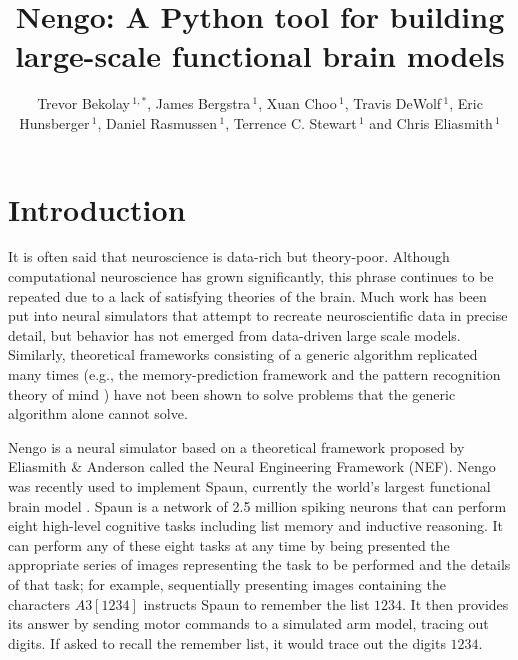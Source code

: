 \documentclass{frontiersSCNS}
\def\keyFont{\fontsize{8}{11}\helveticabold }
\def\firstAuthorLast{Bekolay {et~al.}}
\def\Authors{Trevor Bekolay\,$^{1,*}$, James Bergstra\,$^{1}$,
  Xuan Choo\,$^{1}$, Travis DeWolf\,$^{1}$, Eric Hunsberger\,$^{1}$,
  Daniel Rasmussen\,$^{1}$, Terrence C. Stewart\,$^{1}$
  and Chris Eliasmith\,$^{1}$}
\begin{document}
\onecolumn
{}

\title[Nengo in Python]{Nengo: A Python tool for
  building large-scale functional brain models}
\author[\firstAuthorLast ]{\Authors}
\address{}
\correspondance{}
\extraAuth{}

\maketitle

\begin{abstract}

  \tiny \keyFont{\section{Keywords:} 1 2 3 4 5 (6 7 8)}
\end{abstract}


\section{Introduction}

It is often said that neuroscience
is data-rich but theory-poor.
Although computational neuroscience
has grown significantly,
this phrase continues to be repeated
due to a lack of satisfying
theories of the brain.
Much work has been put into neural simulators
that attempt to recreate neuroscientific
data in precise detail,
but behavior has not emerged
from data-driven large scale models.
Similarly, theoretical frameworks
consisting of a generic algorithm
replicated many times
(e.g., the memory-prediction framework \cite{TODO}
and the pattern recognition theory of mind \cite{TODO})
have not been shown to solve problems
that the generic algorithm alone cannot solve.

Nengo is a neural simulator
based on a theoretical framework proposed
by Eliasmith \& Anderson \citeyearpar{TODO}
called the Neural Engineering Framework
(NEF).
Nengo was recently used to implement Spaun,
currently the world's largest functional brain model
\cite{TODO}.
Spaun is a network of 2.5 million spiking neurons
that can perform eight high-level cognitive tasks
including list memory and inductive reasoning.
It can perform any of these eight tasks
at any time by being presented
the appropriate series of images
representing the task to be performed
and the details of that task;
for example, sequentially presenting images
containing the characters $A3[1234]$ instructs Spaun
to remember the list $1234$.
It then provides its answer by
sending motor commands to a simulated arm model,
tracing out digits.
If asked to recall the remember list,
it would trace out the digits $1234$.
\end{document}
